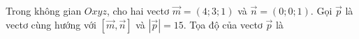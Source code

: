 \begin{ex}
Trong không gian $Oxyz$, cho hai vectơ $\vec m=(4;3;1)$ và $\vec n=(0;0;1)$. Gọi $\vec p$ là vectơ cùng hướng với $\left[\vec m,\vec n\right]$ và $|\vec p|=15$. Tọa độ của vectơ $\vec p$ là
\end{ex}

